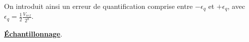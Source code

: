 \documentclass{article}
\begin{document}
On introduit ainsi un erreur de quantification comprise entre $-\epsilon_q$ et $+\epsilon_q$, avec ${\epsilon_q = \frac{1}{2}\frac{V_{ref}}{2^8}}$.



\noindent \textbf{\underline{Échantillonnage}}.

%
\end{document}
